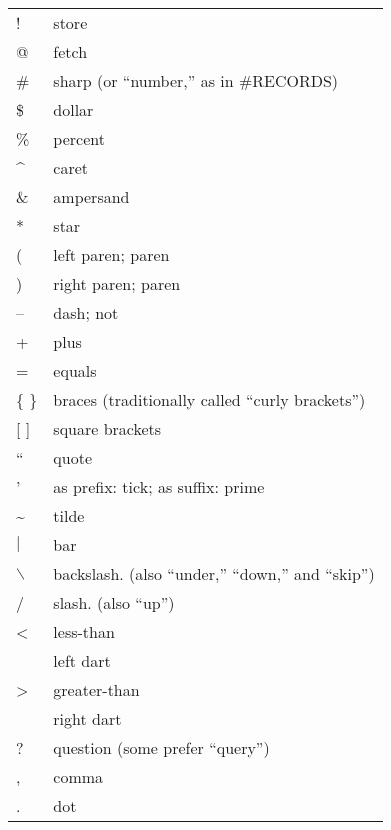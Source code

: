 {\small\begin{tabular}{ll}
{}{\setlength{\parsep}{0cm}}
!&store\\
@&fetch\\
\#&sharp (or ``number,'' as in \#RECORDS)\\
\$&dollar\\
\%&percent\\
\^{ }&caret\\
\&&ampersand\\
{*}&star\\
(&left paren; paren\\
)&right paren; paren\\
--&dash; not\\
+&plus\\
=&equals\\
\{ \}&braces (traditionally called ``curly brackets'')\\
{[} {]}&square brackets\\
``&quote\\
'&as prefix: tick; as suffix: prime\\
\~{ }&tilde\\
\(|\)&bar\\
\(\backslash\)&backslash. (also ``under,'' ``down,'' and ``skip'')\\
/&slash. (also ``up'')\\
<&less-than\\
 &left dart\\
>&greater-than\\
 &right dart\\
?&question (some prefer ``query'')\\
,&comma\\
.&dot\\
\end{tabular}}

